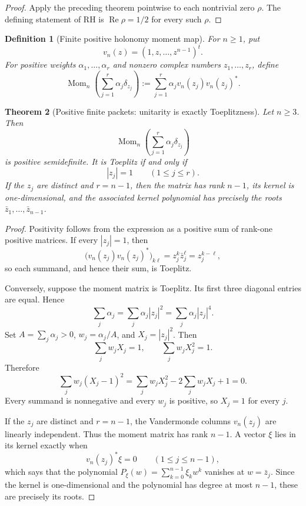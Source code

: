 \documentclass[11pt]{article}
\newtheorem{definition}{Definition}
\newtheorem{theorem}[definition]{Theorem}
\newcommand{\Mom}{\operatorname{Mom}}
\begin{document}
\begin{proof}
Apply the preceding theorem pointwise to each nontrivial zero $\rho$.  The defining statement of RH is $\operatorname{Re}\rho=1/2$ for every such $\rho$.
\end{proof}

\begin{definition}[Finite positive holonomy moment map]
For $n\ge1$, put
\[
 v_n(z)=(1,z,\ldots,z^{n-1})^t.
\]
For positive weights $\alpha_1,\ldots,\alpha_r$ and nonzero complex numbers $z_1,\ldots,z_r$, define
\[
 \Mom_n\!\left(\sum_{j=1}^r\alpha_j\delta_{z_j}\right)
 :=\sum_{j=1}^r\alpha_jv_n(z_j)v_n(z_j)^*.
\]
\end{definition}

\begin{theorem}[Positive finite packets: unitarity is exactly Toeplitzness]
Let $n\ge3$.  Then
\[
 \Mom_n\!\left(\sum_{j=1}^r\alpha_j\delta_{z_j}\right)
\]
is positive semidefinite.  It is Toeplitz if and only if
\[
 |z_j|=1\qquad(1\le j\le r).
\]
If the $z_j$ are distinct and $r=n-1$, then the matrix has rank $n-1$, its kernel is one-dimensional, and the associated kernel polynomial has precisely the roots $\bar z_1,\ldots,\bar z_{n-1}$.
\end{theorem}

\begin{proof}
Positivity follows from the expression as a positive sum of rank-one positive matrices.  If every $|z_j|=1$, then
\[
 \bigl(v_n(z_j)v_n(z_j)^*\bigr)_{k\ell}
 =z_j^k\bar z_j^{\ell}=z_j^{k-\ell},
\]
so each summand, and hence their sum, is Toeplitz.

Conversely, suppose the moment matrix is Toeplitz.  Its first three diagonal entries are equal.  Hence
\[
 \sum_j\alpha_j
 =\sum_j\alpha_j|z_j|^2
 =\sum_j\alpha_j|z_j|^4.
\]
Set $A=\sum_j\alpha_j>0$, $w_j=\alpha_j/A$, and $X_j=|z_j|^2$.  Then
\[
 \sum_jw_jX_j=1,
 \qquad
 \sum_jw_jX_j^2=1.
\]
Therefore
\[
 \sum_jw_j(X_j-1)^2
 =\sum_jw_jX_j^2-2\sum_jw_jX_j+1=0.
\]
Every summand is nonnegative and every $w_j$ is positive, so $X_j=1$ for every $j$.

If the $z_j$ are distinct and $r=n-1$, the Vandermonde columns $v_n(z_j)$ are linearly independent.  Thus the moment matrix has rank $n-1$.  A vector $\xi$ lies in its kernel exactly when
\[
 v_n(z_j)^*\xi=0
 \qquad(1\le j\le n-1),
\]
which says that the polynomial $P_\xi(w)=\sum_{k=0}^{n-1}\xi_kw^k$ vanishes at $w=\bar z_j$.  Since the kernel is one-dimensional and the polynomial has degree at most $n-1$, these are precisely its roots.
\end{proof}
\end{document}
